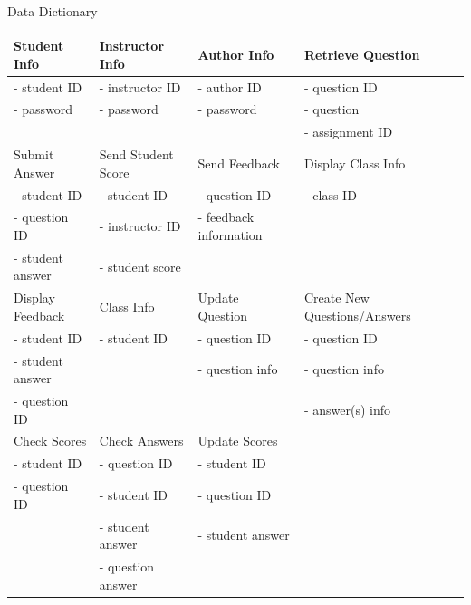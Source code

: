 \documentclass{article}
\begin{document}
\begin{section}{Data Dictionary}
\begin{center}
    \begin{tabular}{ | l | l | l |l| p{5cm} |}
   \hline
    Student Info & Instructor Info & Author Info & Retrieve Question \\ \hline


    - student ID	&  - instructor ID  &  - author ID          & - question ID  \\
    - password		&  - password      	&  - password           & - question  \\ 
					&              	  	&                       & - assignment ID\\ \hline

    
       
    
Submit Answer		  	& Send Student Score & Send Feedback 				& Display Class Info\\ \hline

       - student ID   	&  - student ID    	 &  - question ID				& - class ID  \\ 
       - question ID  	&  - instructor ID   &  - feedback information      & \\
	   - student answer &  - student score   &               				&\\ \hline
    
    
Display Feedback		  	& Class Info 		& Update Question 				& Create New Questions/Answers\\ \hline

       - student ID   			&  - student ID   		 &  - question ID				& - question ID  \\ 
       - student answer 		&  					  	 &  - question info			    & - question info\\
	   - question ID 			&  					   	 &               				& - answer(s) info\\ \hline    
    
    
Check Scores		  	& Check Answers 		& Update Scores 				& \\ \hline

       - student ID 			&  - question ID   		 &  - student ID				&   \\ 
       - question ID 			&  - student ID		  	 &  - question ID		   		&  \\
								&  - student answer	  	 &  - student answer		    &  \\	   
	    						&  - question answer  	 &               				&  \\ \hline       
    
    
    
    \hline
    \end{tabular}
\end{center}
\end{section}
\newpage
\end{document}

